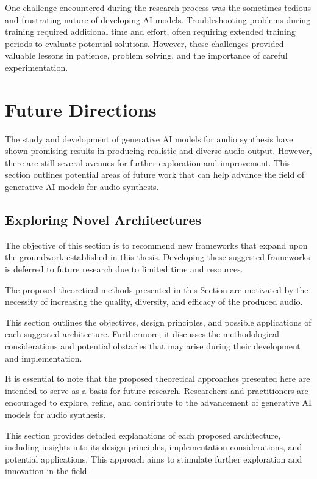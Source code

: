 One challenge encountered during the research process was the sometimes tedious and frustrating nature of developing \ac{AI} models. Troubleshooting problems during training required additional time and effort, often requiring extended training periods to evaluate potential solutions. However, these challenges provided valuable lessons in patience, problem solving, and the importance of careful experimentation.


\section{Future Directions} \label{sec:future-directions}

The study and development of generative \ac{AI} models for audio synthesis have shown promising results in producing realistic and diverse audio output. However, there are still several avenues for further exploration and improvement. This section outlines potential areas of future work that can help advance the field of generative \ac{AI} models for audio synthesis.

\subsection{Exploring Novel Architectures}

The objective of this section is to recommend new frameworks that expand upon the groundwork established in this thesis. Developing these suggested frameworks is deferred to future research due to limited time and resources.

The proposed theoretical methods presented in this Section are motivated by the necessity of increasing the quality, diversity, and efficacy of the produced audio.

This section outlines the objectives, design principles, and possible applications of each suggested architecture. Furthermore, it discusses the methodological considerations and potential obstacles that may arise during their development and implementation.

It is essential to note that the proposed theoretical approaches presented here are intended to serve as a basis for future research. Researchers and practitioners are encouraged to explore, refine, and contribute to the advancement of generative \ac{AI} models for audio synthesis.

This section provides detailed explanations of each proposed architecture, including insights into its design principles, implementation considerations, and potential applications. This approach aims to stimulate further exploration and innovation in the field.

